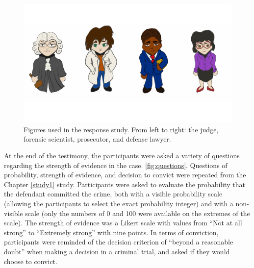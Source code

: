 \documentclass[print]{nuthesis}
\begin{document}
\begin{figure}

{\centering \includegraphics[width=\linewidth]{thesis_files/figure-latex/responsefigures-1} 

}

\caption{Figures used in the response study. From left to right: the judge, forensic scientist, prosecutor, and defense lawyer.}\label{fig:responsefigures}
\end{figure}

At the end of the testimony, the participants were asked a variety of questions regarding the strength of evidence in the case.
 \ref{fig:questions}.
Questions of probability, strength of evidence, and decision to convict were repeated from the Chapter \ref{study1} study.
Participants were asked to evaluate the probability that the defendant committed the crime, both with a visible probability scale (allowing the participants to select the exact probability integer) and with a non-visible scale (only the numbers of 0 and 100 were available on the extremes of the scale).
The strength of evidence was a Likert scale with values from ``Not at all strong'' to ``Extremely strong'' with nine points.
In terms of conviction, participants were reminded of the decision criterion of ``beyond a reasonable doubt'' when making a decision in a criminal trial, and asked if they would choose to convict.
\end{document}
